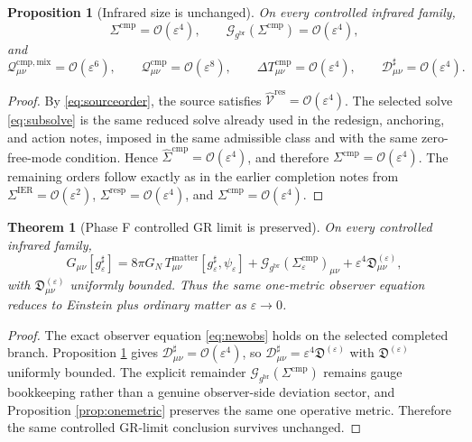 \documentclass[11pt]{article}
\newcommand{\ObserverMetric}{g^{\mathrm{br}}}
\newcommand{\CompletedMetric}{g^{\sharp}}
\newcommand{\BaseShift}{\Sigma^{\mathrm{IER}}}
\newcommand{\ResponseShift}{\Sigma^{\mathrm{resp}}}
\newcommand{\CompShift}{\Sigma^{\mathrm{cmp}}}
\newcommand{\CompLift}{\widehat\Sigma^{\mathrm{cmp}}}
\newcommand{\ResidualLift}{\widehat{\mathcal V}^{\mathrm{res}}}
\newcommand{\GaugeBook}{\mathcal G_{\ObserverMetric}}
\newcommand{\CompMix}{\mathcal Q_{\mu\nu}^{\mathrm{cmp,mix}}}
\newcommand{\CompQuad}{\mathcal Q_{\mu\nu}^{\mathrm{cmp}}}
\newcommand{\CompDec}{\mathcal D_{\mu\nu}^{\sharp}}
\newcommand{\DeltaTComp}{\Delta T_{\mu\nu}^{\mathrm{cmp}}}
\newcommand{\epsIR}{\varepsilon}
\newtheorem{proposition}{Proposition}
\newtheorem{theorem}{Theorem}
\begin{document}
\begin{proposition}[Infrared size is unchanged]
\label{prop:size}
On every controlled infrared family,
\begin{equation}
\CompShift=\mathcal O(\epsIR^4),
\qquad
\GaugeBook(\CompShift)=\mathcal O(\epsIR^4),
\label{eq:ircomp}
\end{equation}
and
\begin{equation}
\CompMix=\mathcal O(\epsIR^6),
\qquad
\CompQuad=\mathcal O(\epsIR^8),
\qquad
\DeltaTComp=\mathcal O(\epsIR^4),
\qquad
\CompDec=\mathcal O(\epsIR^4).
\label{eq:irsizes}
\end{equation}
\end{proposition}

\begin{proof}
By \eqref{eq:sourceorder}, the source satisfies \(\ResidualLift=\mathcal O(\epsIR^4)\). The selected solve \eqref{eq:subsolve} is the same reduced solve already used in the redesign, anchoring, and action notes, imposed in the same admissible class and with the same zero-free-mode condition. Hence \(\CompLift=\mathcal O(\epsIR^4)\), and therefore \(\CompShift=\mathcal O(\epsIR^4)\). The remaining orders follow exactly as in the earlier completion notes from \(\BaseShift=\mathcal O(\epsIR^2)\), \(\ResponseShift=\mathcal O(\epsIR^4)\), and \(\CompShift=\mathcal O(\epsIR^4)\).
\end{proof}

\begin{theorem}[Phase F controlled GR limit is preserved]
\label{thm:phaseF}
On every controlled infrared family,
\begin{equation}
G_{\mu\nu}[\CompletedMetric_{\epsIR}]
=
8\pi G_N\,T_{\mu\nu}^{\mathrm{matter}}[\CompletedMetric_{\epsIR},\psi_{\epsIR}]
+\GaugeBook(\CompShift_{\epsIR})_{\mu\nu}
+\epsIR^4\mathfrak D_{\mu\nu}^{(\epsIR)},
\label{eq:phaseFnew}
\end{equation}
with \(\mathfrak D_{\mu\nu}^{(\epsIR)}\) uniformly bounded. Thus the same one-metric observer equation reduces to Einstein plus ordinary matter as \(\epsIR\to 0\).
\end{theorem}

\begin{proof}
The exact observer equation \eqref{eq:newobs} holds on the selected completed branch. Proposition \ref{prop:size} gives \(\CompDec=\mathcal O(\epsIR^4)\), so \(\CompDec=\epsIR^4\mathfrak D^{(\epsIR)}\) with \(\mathfrak D^{(\epsIR)}\) uniformly bounded. The explicit remainder \(\GaugeBook(\CompShift)\) remains gauge bookkeeping rather than a genuine observer-side deviation sector, and Proposition \ref{prop:onemetric} preserves the same one operative metric. Therefore the same controlled GR-limit conclusion survives unchanged.
\end{proof}
\end{document}
